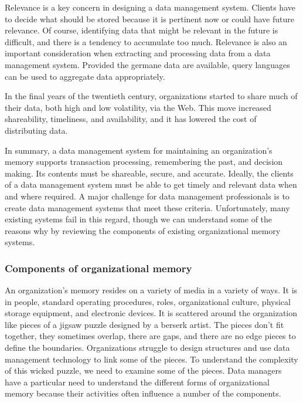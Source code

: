 \documentclass[
]{article}
\begin{document}
Relevance is a key concern in designing a data management system.
Clients have to decide what should be stored because it is pertinent now
or could have future relevance. Of course, identifying data that might
be relevant in the future is difficult, and there is a tendency to
accumulate too much. Relevance is also an important consideration when
extracting and processing data from a data management system. Provided
the germane data are available, query languages can be used to aggregate
data appropriately.

In the final years of the twentieth century, organizations started to
share much of their data, both high and low volatility, via the Web.
This move increased shareability, timeliness, and availability, and it
has lowered the cost of distributing data.

In summary, a data management system for maintaining an organization's
memory supports transaction processing, remembering the past, and
decision making. Its contents must be shareable, secure, and accurate.
Ideally, the clients of a data management system must be able to get
timely and relevant data when and where required. A major challenge for
data management professionals is to create data management systems that
meet these criteria. Unfortunately, many existing systems fail in this
regard, though we can understand some of the reasons why by reviewing
the components of existing organizational memory systems.

\hypertarget{components-of-organizational-memory}{%
\subsubsection*{Components of organizational memory}\label{components-of-organizational-memory}}

An organization's memory resides on a variety of media in a variety of
ways. It is in people, standard operating procedures, roles,
organizational culture, physical storage equipment, and electronic
devices. It is scattered around the organization like pieces of a jigsaw
puzzle designed by a berserk artist. The pieces don't fit together, they
sometimes overlap, there are gaps, and there are no edge pieces to
define the boundaries. Organizations struggle to design structures and
use data management technology to link some of the pieces. To understand
the complexity of this wicked puzzle, we need to examine some of the
pieces. Data managers have a particular need to understand the different
forms of organizational memory because their activities often influence
a number of the components.
\end{document}
